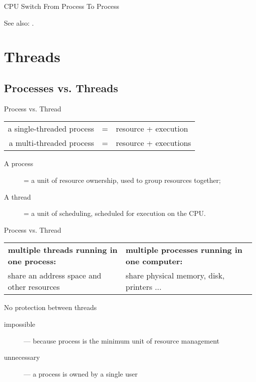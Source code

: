 \begin{frame}{CPU Switch From Process To Process}
  \begin{center}
  \end{center}
\end{frame}

See also: .


\section{Threads}
\label{sec:threads}

\subsection{Processes vs. Threads}
\label{sec:proc-vs.-thre}

\begin{frame}{Process vs. Thread}
    \begin{tabular}{rcl}
      a single-threaded process&=&resource + execution\\
      a  multi-threaded process&=&resource + executions\\
    \end{tabular}
    \begin{center}
    \end{center}
  \begin{description}
  \item[A process] = a unit of resource ownership, used to group resources together;
  \item[A thread] = a unit of scheduling, scheduled for execution on the CPU.
  \end{description}  
\end{frame}

\begin{frame}{Process vs. Thread}
  \begin{center}
    \begin{tabularx}{.9\textwidth}{X|X}
      \textbf{multiple threads running in one process:}&
      \textbf{multiple processes running in one computer:}\\
      share an address space and other resources&
      share physical memory, disk, printers ...\\
    \end{tabularx}
  \end{center}
  \begin{block}{No protection between threads}
    \begin{description}
    \item[impossible] --- because process is the minimum unit of resource management
    \item[unnecessary] --- a process is owned by a single user
    \end{description}    
  \end{block}
\end{frame}

